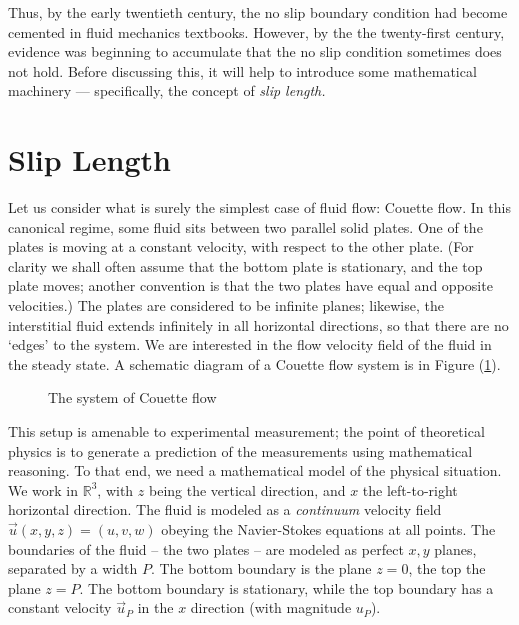 \documentclass[12pt, a4paper, twoside, openright]{book}
\begin{document}
Thus, by the early twentieth century, the no slip boundary condition had become cemented in fluid mechanics textbooks. However, by the the twenty-first century, evidence was beginning to accumulate that the no slip condition sometimes does not hold.
Before discussing this, it will help to introduce some mathematical machinery --- specifically, the concept of \emph{slip length.}

\section{Slip Length}

Let us consider what is surely the simplest case of fluid flow: Couette flow.  In this canonical regime, some fluid sits between two parallel solid plates. One of the plates is moving at a constant velocity, with respect to the other plate. (For clarity we shall often assume that the bottom plate is stationary, and the top plate moves; another convention is that the two plates have equal and opposite velocities.) The plates are considered to be infinite planes; likewise, the interstitial fluid extends infinitely in all horizontal directions, so that there are no `edges' to the system. We are interested in the flow velocity field of the fluid in the steady state.  A schematic diagram of a Couette flow system is in Figure (\ref{Couettesystem}).
\clearpage

\begin{figure}[ht]
\centering
{}
\caption{The system of Couette flow} \label{Couettesystem}
\end{figure}

This setup is amenable to experimental measurement; the point of theoretical physics is to generate a prediction of the measurements using mathematical reasoning.  To that end, we need a mathematical model of the physical situation.
We work in $\mathbb{R}^{3}$, with $z$ being the vertical direction, and $x$ the left-to-right horizontal direction. The fluid is modeled as a \emph{continuum} velocity field $\vec{u}(x,y,z) = (u,v,w) $ obeying the Navier-Stokes equations at all points. The boundaries of the fluid -- the two plates -- are modeled as perfect $x,y$ planes, separated by a width $P$. The bottom boundary is the plane $z=0$, the top the plane $z=P$.
The bottom boundary is stationary, while the top boundary has a constant velocity $\vec{u}_P$ in the $x$ direction (with magnitude $u_{P}$). 
\end{document}
